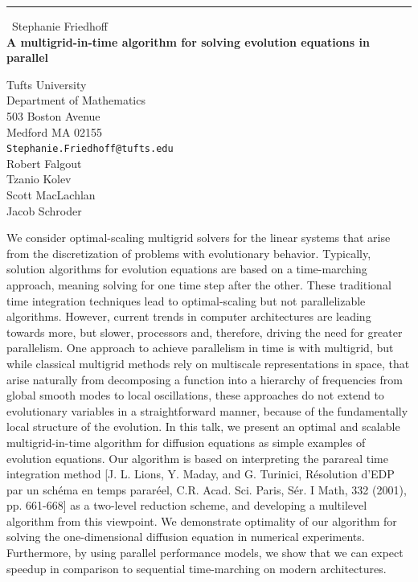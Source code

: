 \documentclass{report}
\begin{document}
\begin{center}
\rule{6in}{1pt} \
{\large Stephanie Friedhoff \\
{\bf A multigrid-in-time algorithm for solving evolution equations in parallel}}

Tufts University \\ Department of Mathematics \\ 503 Boston Avenue \\ Medford MA 02155
\\
{\tt Stephanie.Friedhoff@tufts.edu}\\
Robert Falgout\\
Tzanio Kolev\\
Scott MacLachlan\\
Jacob Schroder\end{center}

We consider optimal-scaling multigrid solvers for the linear systems that
arise from the discretization of problems with evolutionary behavior.
Typically, solution algorithms for evolution equations are based on a
time-marching approach, meaning solving for one time step after the
other. These traditional time integration techniques lead to
optimal-scaling but not parallelizable algorithms. However, current
trends in computer architectures are leading towards more, but slower,
processors and, therefore, driving the need for greater parallelism. One
approach to achieve parallelism in time is with multigrid, but while
classical multigrid methods rely on multiscale representations in space,
that arise naturally from decomposing a function into a hierarchy of
frequencies from global smooth modes to local oscillations, these
approaches do not extend to evolutionary variables in a straightforward
manner, because of the fundamentally local structure of the evolution. In
this talk, we present an optimal and scalable multigrid-in-time algorithm
for diffusion equations as simple examples of evolution equations. Our
algorithm is based on interpreting the parareal time integration method
[J. L. Lions, Y. Maday, and G. Turinici, R\'{e}solution d'EDP par un
sch\'{e}ma en temps parar\'{e}el, C.R. Acad. Sci. Paris, S\'{e}r. I Math,
332 (2001), pp. 661-668] as a two-level reduction scheme, and developing
a multilevel algorithm from this viewpoint. We demonstrate optimality of
our algorithm for solving the one-dimensional diffusion equation in
numerical experiments. Furthermore, by using parallel performance models,
we show that we can expect speedup in comparison to sequential
time-marching on modern architectures.
\end{document}
